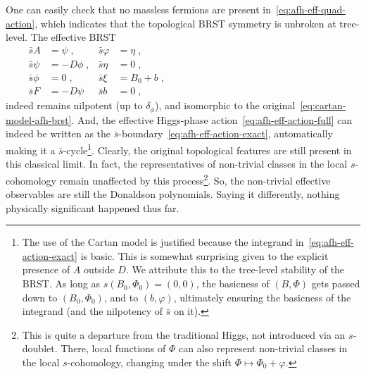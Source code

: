 \documentclass[../main.tex]{subfiles}
\begin{document}
One can easily check that no massless fermions are present in~\eqref{eq:afh-eff-quad-action}, which indicates that the topological BRST symmetry is unbroken at tree-level. The effective BRST
\begin{subequations}%
  \label{eq:afh-bar-brst}
  \begin{align}
    \bar{s} A    & =   \psi \;,   & \bar{s} \varphi & =   \eta \;,    & \hspace{200pt}                            \\
    \bar{s} \psi & =  - D\phi \;, & \bar{s} \eta    & = 0 \;,         & \hspace{200pt}                            \\
    \bar{s} \phi & = 0 \;,        & \bar{s} \xi     & =  B_0 + b  \;, & \hspace{200pt}\label{eq:afh-bar-brst-ssb} \\
    \bar{s} F    & = -D\psi       & \bar{s} b       & = 0      \;,    & \hspace{200pt}
  \end{align}
\end{subequations}
indeed remains nilpotent (up to $\delta_{\phi}$), and isomorphic to the original~\eqref{eq:cartan-model-afh-brst}. And, the effective Higgs-phase action~\eqref{eq:afh-eff-action-full} can indeed be written as the $\bar{s}$-boundary~\eqref{eq:afh-eff-action-exact}, automatically making it a $\bar{s}$-cycle\footnote{The use of the Cartan model is justified because the integrand in~\eqref{eq:afh-eff-action-exact} is basic. This is somewhat surprising given to the explicit presence of $A$ outside $D$. We attribute this to the tree-level stability of the BRST\@. As long as $s(B_0, \Phi_0) = (0,0)$, the basicness of $(B,\Phi)$ gets passed down to $(B_0, \Phi_0)$, and to $(b,\varphi)$, ultimately ensuring the basicness of the integrand (and the nilpotency of $\bar{s}$ on it).}. Clearly, the original topological features are still present in this classical limit. In fact, the representatives of non-trivial classes in the local $s$-cohomology remain unaffected by this process\footnote{This is quite a departure from the traditional Higgs, not introduced via an $s$-doublet. There, local functions of $\Phi$ can also represent non-trivial classes in the local $s$-cohomology, changing under the shift $\Phi \mapsto \Phi_0 + \varphi$.}. So, the non-trivial effective observables are still the Donaldson polynomials. Saying it differently, nothing physically significant happened thus far.
\end{document}

